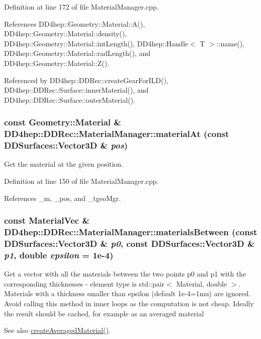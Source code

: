 Definition at line 172 of file MaterialManager.cpp.

References DD4hep::Geometry::Material::A(), DD4hep::Geometry::Material::density(), DD4hep::Geometry::Material::intLength(), DD4hep::Handle$<$ T $>$::name(), DD4hep::Geometry::Material::radLength(), and DD4hep::Geometry::Material::Z().

Referenced by DD4hep::DDRec::createGearForILD(), DD4hep::DDRec::Surface::innerMaterial(), and DD4hep::DDRec::Surface::outerMaterial().\hypertarget{class_d_d4hep_1_1_d_d_rec_1_1_material_manager_a230252814cc77e7d7e718783d376f41f}{
\subsubsection[{materialAt}]{\setlength{\rightskip}{0pt plus 5cm}const {\bf Geometry::Material} \& DD4hep::DDRec::MaterialManager::materialAt (const {\bf DDSurfaces::Vector3D} \& {\em pos})}}
\label{class_d_d4hep_1_1_d_d_rec_1_1_material_manager_a230252814cc77e7d7e718783d376f41f}
Get the material at the given position. 

Definition at line 150 of file MaterialManager.cpp.

References \_\-m, \_\-pos, and \_\-tgeoMgr.\hypertarget{class_d_d4hep_1_1_d_d_rec_1_1_material_manager_a9e975753f152c9deb9c490e9222606c1}{
\subsubsection[{materialsBetween}]{\setlength{\rightskip}{0pt plus 5cm}const {\bf MaterialVec} \& DD4hep::DDRec::MaterialManager::materialsBetween (const {\bf DDSurfaces::Vector3D} \& {\em p0}, \/  const {\bf DDSurfaces::Vector3D} \& {\em p1}, \/  double {\em epsilon} = {\ttfamily 1e-\/4})}}
\label{class_d_d4hep_1_1_d_d_rec_1_1_material_manager_a9e975753f152c9deb9c490e9222606c1}
Get a vector with all the materials between the two points p0 and p1 with the corresponding thicknesses -\/ element type is std::pair$<$ Material, double $>$. Materials with a thickness smaller than epsilon (default 1e-\/4=1mu) are ignored. Avoid calling this method in inner loops as the computation is not cheap. Ideally the result should be cached, for example as an averaged material \begin{DoxySeeAlso}{See also}
\hyperlink{class_d_d4hep_1_1_d_d_rec_1_1_material_manager_a44243f88b984a698c8b823885c439702}{createAveragedMaterial()}. 
\end{DoxySeeAlso}


